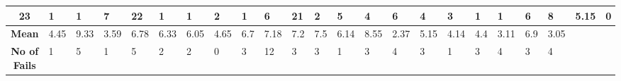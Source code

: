 \begin{table}[t]
\begin{adjustbox}{width=\textwidth}
\begin{tabular}{|c|llllllllllllllllllll|c|c|}
\textbf{23}          & {\color{blue} 1}  & {\color{blue} 1}                      & {\color{blue} 7}                      & {\color{blue} 22}                     & {\color{blue} 1}                      & {\color{blue} 1}                      & {\color{blue} 2}  & {\color{blue} 1}                      & {\color{blue} 6}                      & {\color{blue} 21}                     & {\color{blue} 2}                      & {\color{blue} 5}                      & {\color{blue} 4}                      & {\color{blue} 6}                      & {\color{blue} 4}                      & {\color{blue} 3}                      & {\color{blue} 1}                      & {\color{blue} 1}                      & {\color{blue} 6}                      & {\color{blue} 8}                      & 5.15                                                & 0                                                   \\ \hline
\textbf{Mean}        & 4.45                   & 9.33                                       & 3.59                                       & 6.78                                       & 6.33                                       & 6.05                                       & 4.65                   & 6.7                                        & 7.18                                       & 7.2                                        & 7.5                                        & 6.14                                       & 8.55                                       & 2.37                                       & 5.15                                       & 4.14                                       & 4.4                                        & 3.11                                       &   6.9                                         &                    3.05                        & \multicolumn{1}{|l}{}                                & \multicolumn{1}{l|}{}                                \\ \hline
\textbf{No of Fails} & 1                      & 5                                          & 1                                          & 5                                          & 2                                          & 2                                          & 0                      & 3                                          & 12                                         & 3                                          & 3                                          & 1                                          & 3                                          & 4                                          & 3                                          & 1                                          & 3                                          & 4                                          &       3                                     &    4                                        & \multicolumn{1}{|l}{}                                & \multicolumn{1}{l|}{}    \\ \hline                        
\end{tabular}
\end{adjustbox}

\label{table:humans}
\end{table}

